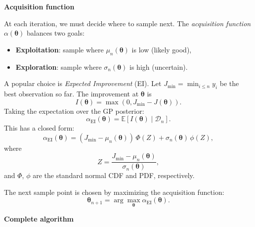 \documentclass[11pt]{article}
\begin{document}
\begin{center}
\end{center}

\vspace{1em}
\begin{center}
\textbf{Acquisition function}
\end{center}

At each iteration, we must decide where to sample next.
The \emph{acquisition function} $\alpha(\bm{\theta})$ balances two goals:
\begin{itemize}[nosep]
    \item \textbf{Exploitation}: sample where $\mu_n(\bm{\theta})$ is low (likely good),
    \item \textbf{Exploration}: sample where $\sigma_n(\bm{\theta})$ is high (uncertain).
\end{itemize}

A popular choice is \emph{Expected Improvement} (EI).
Let $J_{\min} = \min_{i \leq n} y_i$ be the best observation so far.
The improvement at $\bm{\theta}$ is
\[
I(\bm{\theta}) = \max(0, J_{\min} - J(\bm{\theta})).
\]
Taking the expectation over the GP posterior:
\[
\alpha_{\text{EI}}(\bm{\theta}) = \mathbb{E}[I(\bm{\theta}) \mid \mathcal{D}_n].
\]
This has a closed form:
\[
\boxed{
\alpha_{\text{EI}}(\bm{\theta}) = (J_{\min} - \mu_n(\bm{\theta})) \, \Phi(Z) + \sigma_n(\bm{\theta}) \, \phi(Z),
}
\]
where
\[
Z = \frac{J_{\min} - \mu_n(\bm{\theta})}{\sigma_n(\bm{\theta})},
\]
and $\Phi$, $\phi$ are the standard normal CDF and PDF, respectively.

The next sample point is chosen by maximizing the acquisition function:
\[
\bm{\theta}_{n+1} = \arg\max_{\bm{\theta}} \alpha_{\text{EI}}(\bm{\theta}).
\]

\vspace{1em}
\begin{center}
\textbf{Complete algorithm}
\end{center}
\end{document}
